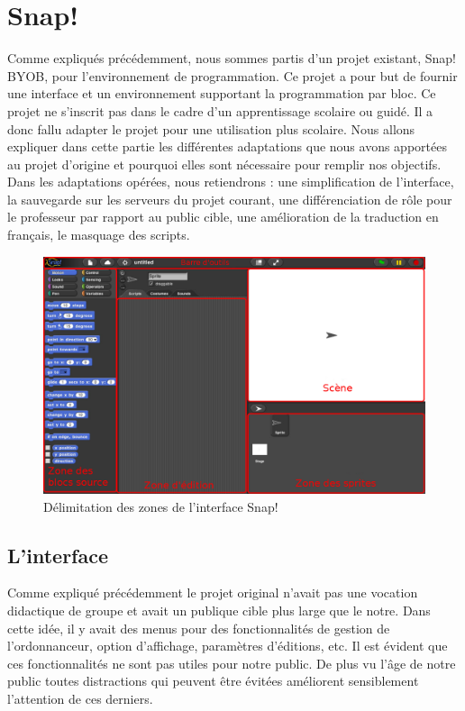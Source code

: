 ﻿\section{Snap!}
\label{solution SNAP}
Comme expliqués précédemment, nous sommes partis d'un projet existant, Snap! BYOB, pour l'environnement de programmation. Ce projet a pour but de fournir une interface et un environnement supportant la programmation par bloc. Ce projet ne s'inscrit pas dans le cadre d'un apprentissage scolaire ou guidé. Il a donc fallu adapter le projet pour une utilisation plus scolaire. Nous allons expliquer dans cette partie les différentes adaptations que nous avons apportées au projet d'origine et pourquoi elles sont nécessaire pour remplir nos objectifs.\\

Dans les adaptations opérées, nous retiendrons : une simplification de l'interface, la sauvegarde sur les serveurs du projet courant, une différenciation de rôle pour le professeur par rapport au public cible, une amélioration de la traduction en français, le masquage des scripts.

\begin{figure}[ht]
  \begin{center}
    \includegraphics[scale=0.3]{content/7-solution/2-snap/images/interface}
    \caption{Délimitation des zones de l'interface Snap!}
    \label{fig:snap interface}
  \end{center}
\end{figure}

\subsection{L'interface}
\label{interface}
Comme expliqué précédemment le projet original n'avait pas une vocation didactique de groupe et avait un publique cible plus large que le notre. Dans cette idée, il y avait des menus pour des fonctionnalités de gestion de l'ordonnanceur, option d'affichage, paramètres d'éditions, etc. Il est évident que ces fonctionnalités ne sont pas utiles pour notre public. De plus vu l'âge de notre public toutes distractions qui peuvent être évitées améliorent sensiblement l'attention de ces derniers.

